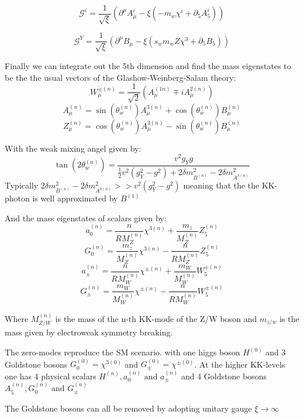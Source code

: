 \documentclass{article}
\begin{document}
\begin{equation*}
  \mathcal{G}^i =\frac{1}{\sqrt{\xi}}(\partial^\mu A_\mu^i-\xi(-m_w\chi^i+\partial_5A_5^i))
\end{equation*}

\begin{equation}
  \mathcal{G}^Y =\frac{1}{\sqrt{\xi}}(\partial^\mu B_\mu-\xi(s_wm_w
  Z\chi^3+\partial_5B_5))
\end{equation}

Finally we can integrate out the 5th dimension and find the mass eigenstates to be the the usual vectors of the Glashow-Weinberg-Salam theory:
\begin{equation*}
    W^{\pm(n)}_\mu=\frac{1}{\sqrt{2}}(A^{(1n)}_\mu\mp iA^{2(n)}_\mu)
\end{equation*}\begin{equation*}
    A^{(n)}_\mu=\sin(\theta_w^{(n)})A^{3(n)}_\mu+\cos(\theta_w^{(n)})B^{(n)}_\mu
\end{equation*}\begin{equation}
    Z^{(n)}_\mu=\cos(\theta_w^{(n)})A_\mu^{3(n)}-\sin(\theta_w^{(n)})B^{(n)}_\mu
\end{equation}

With the weak mixing angel given by:
\begin{equation}
\tan(2\theta_w^{(n)})=\frac{v^2g_Yg}{\frac{1}{2}v^2(g_Y^2-g^2)+2\delta m_{B^{(n)}}
^2-2\delta m_{A^{3(n)}}^2}
\end{equation}
Typically  $2\delta m_{B^{(n)}}
^2-2\delta m_{A^{3(n)}}^2>>v^2(g_Y^2-g^2)$ meaning that the the KK-photon is well approximated by $B^{(1)}$ 

And the mass eigenstates  of scalars given by:
\begin{equation*}
    a_0^{(n)}=\frac{n}{RM^{(n)}_{Z}}\chi^{3(n)}+\frac{m_z}{M^{(n)}_{Z}}Z_5^{(n)}
\end{equation*}\begin{equation*}
    G_0^{(n)}=\frac{m_z}{M^{(n)}_{Z}}\chi^{3(n)}-\frac{n}{RM^{(n)}_{Z}}Z_5^{(n)}
\end{equation*}\begin{equation*}
    a_\pm^{(n)}=\frac{n}{RM^{(n)}_{W}}\chi^{\pm(n)}+\frac{m_W}{M^{(n)}_{W}}W^{\pm (n)}_5
\end{equation*}\begin{equation}
    G_\pm^{(n)}=\frac{m_W}{M^{(n)}_{W}}\chi^{\pm(n)}-\frac{n}{RM^{(n)}_{W}}W^{\pm (n)}_5
\end{equation}

Where $M_{Z/W}^{(n)}$ is the mass of the n-th KK-mode of the Z/W boson and $m_{z/w}$ is the mass given by electroweak symmetry breaking. 

The zero-modes reproduce the SM scenario. with one higgs boson $H^{(0)}$ and 3 Goldstone bosons $G_0^{(0)}=\chi^{3(0)}$ and $G_\pm^{(0)}=\chi^{\pm(0)}$. At the higher KK-levels one has 4 physical scalars $H^{(n)}, a^{(n)}_0\text{ and }a^{(n)}_\pm$ and 4 Goldstone bosons $A_5^{(n)}, G_0^{(n)}\text{ and } G^{(n)}_\pm$

The Goldstone bosons can all be removed by adopting unitary gauge $\xi\rightarrow \infty$
\end{document}
